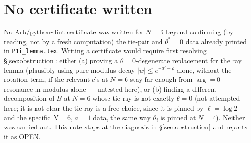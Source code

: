 \documentclass[11pt]{article}
\theoremstyle{plain}
\theoremstyle{remark}
\begin{document}
\section{No certificate written}
No Arb/python-flint certificate was written for $N=6$ beyond confirming (by reading, not by a fresh
computation) the tie-pair and $\theta^\ast=0$ data already printed in \texttt{P1i\_lemma.tex}. Writing a
certificate would require first resolving \S\ref{sec:obstruction}: either (a) proving a
$\theta=0$-degenerate replacement for the ray lemma (plausibly using pure modulus decay
$|w|\le e^{-a'-\rho}$ alone, without the rotation term, if the relevant $c$'s at $N=6$ stay far enough
from $\arg=0$ resonance in modulus alone --- untested here), or (b) finding a different decomposition of
$B$ at $N=6$ whose tie ray is not exactly $\theta=0$ (not attempted here; it is not clear the tie ray is a
free choice, since it is pinned by $\ell=\log2$ and the specific $N=6$, $a=1$ data, the same way $\theta_i$
is pinned at $N=4$). Neither was carried out. This note stops at the diagnosis in
\S\ref{sec:obstruction} and reports it as OPEN.
\end{document}
